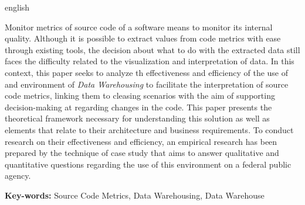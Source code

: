 \begin{resumo}[Abstract]
 \begin{otherlanguage*}{english}

Monitor metrics of source code of a software means to monitor its internal quality. Although it is possible to extract values from code metrics with ease through existing tools, the decision about what to do with the extracted data still faces the difficulty related to the visualization and interpretation of data. In this context, this paper seeks to analyze th effectiveness and efficiency of the use of and environment of \textit{Data Warehousing} to facilitate the interpretation of source code metrics, linking them to cleasing scenarios with the aim of supporting decision-making at regarding changes in the code. This paper presents the theoretical framework necessary for understanding this solution as well as elements that relate to their architecture and business requirements. To conduct research on their effectiveness and efficiency, an empirical research has been prepared by the technique of case study that aims to answer qualitative and quantitative questions regarding the use of this environment on a federal public agency.
 
\textbf{Key-words:} Source Code Metrics,  Data Warehousing, Data Warehouse

 \end{otherlanguage*}
\end{resumo}



 		